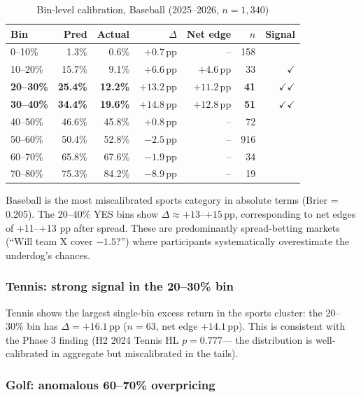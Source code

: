 \documentclass[11pt,a4paper]{article}
\begin{document}
\begin{table}[H]
\centering
\caption{Bin-level calibration, Baseball (2025--2026, $n=1{,}340$)}
\label{tab:baseball}
\small
\begin{tabular}{lrrrrrr}
\toprule
Bin & Pred & Actual & $\Delta$ & Net edge & $n$ & Signal \\
\midrule
0--10\%   & 1.3\% &  0.6\% & $+0.7\,\mathrm{pp}$ & -- & 158 & \\
10--20\%  & 15.7\% &  9.1\% & $+6.6\,\mathrm{pp}$ & $+4.6\,\mathrm{pp}$ & 33 & $\checkmark$ \\
\textbf{20--30\%}  & \textbf{25.4\%} & \textbf{12.2\%} & $\mathbf{+13.2\,\mathrm{pp}}$ & $\mathbf{+11.2\,\mathrm{pp}}$ & \textbf{41} & $\checkmark\checkmark$ \\
\textbf{30--40\%}  & \textbf{34.4\%} & \textbf{19.6\%} & $\mathbf{+14.8\,\mathrm{pp}}$ & $\mathbf{+12.8\,\mathrm{pp}}$ & \textbf{51} & $\checkmark\checkmark$ \\
40--50\%  & 46.6\% & 45.8\% & $+0.8\,\mathrm{pp}$ & -- & 72 & \\
50--60\%  & 50.4\% & 52.8\% & $-2.5\,\mathrm{pp}$ & -- & 916 & \\
60--70\%  & 65.8\% & 67.6\% & $-1.9\,\mathrm{pp}$ & -- & 34 & \\
70--80\%  & 75.3\% & 84.2\% & $-8.9\,\mathrm{pp}$ & -- & 19 & \\
\bottomrule
\end{tabular}
\end{table}

Baseball is the most miscalibrated sports category in absolute terms
(Brier = 0.205). The 20--40\% YES bins show $\Delta \approx +13$--$+15\,\mathrm{pp}$,
corresponding to net edges of +11--+13 pp after spread.
These are predominantly spread-betting markets (``Will team X cover $-1.5$?'')
where participants systematically overestimate the underdog's chances.

\subsubsection{Tennis: strong signal in the 20--30\% bin}

Tennis shows the largest single-bin excess return in the sports cluster:
the 20--30\% bin has $\Delta = +16.1\,\mathrm{pp}$ ($n=63$, net edge $+14.1\,\mathrm{pp}$).
This is consistent with the Phase 3 finding (H2 2024 Tennis HL $p=0.777$---
the distribution is well-calibrated in aggregate but miscalibrated in the tails).

\subsubsection{Golf: anomalous 60--70\% overpricing}
\end{document}
